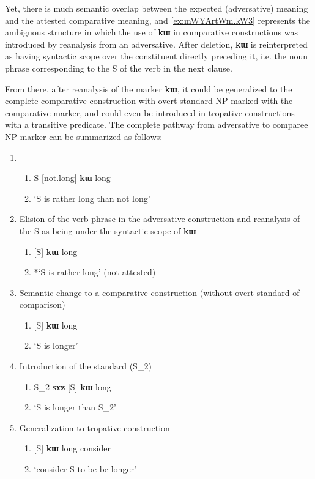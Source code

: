 \documentclass[oldfontcommands,oneside,a4paper,11pt]{article}
\newcommand{\ipa}[1]{{\phon\textbf{#1}}}
\begin{document}
  
  Yet, there is much semantic overlap   between the expected (adversative) meaning and the attested comparative meaning, and \ref{ex:mWYArtWm.kW3}   represents the ambiguous structure in which the use of \ipa{kɯ} in comparative constructions was introduced by reanalysis from an adversative. After deletion, \ipa{kɯ} is reinterpreted as having syntactic scope over the constituent directly preceding it, i.e. the noun phrase corresponding to the S of the verb in the next clause.
  
  From there, after reanalysis of the marker \ipa{kɯ}, it could be generalized to the complete comparative construction with overt standard NP marked with the comparative marker, and could even be introduced in tropative constructions with a transitive predicate. The complete pathway from adversative to comparee NP marker can be summarized as follows:
  
\begin{enumerate} 
\item 
\begin{enumerate} 
\item S [not.long] \ipa{kɯ} long 
\item `S is rather long than not long'
\end{enumerate} 
\item Elision of the verb phrase in the adversative construction  and reanalysis of the S as being under the syntactic scope of \ipa{kɯ}
\begin{enumerate} 
\item{} [S] \ipa{kɯ} long  
\item *`S is rather long' (not attested)
\end{enumerate} 
\item Semantic change to a comparative construction (without overt standard of comparison)
\begin{enumerate} 
\item{} [S] \ipa{kɯ} long  
\item `S is longer'  
\end{enumerate} 
\item Introduction of the standard (S_2)
\begin{enumerate} 
\item{} S_2 \ipa{sɤz} [S] \ipa{kɯ} long  
\item  `S is longer than S_2'
\end{enumerate} 
\item Generalization to tropative construction
\begin{enumerate} 
\item{}  [S] \ipa{kɯ} long  consider  
\item  `consider S to be be longer'
\end{enumerate} 
 
\end{enumerate}
  
\end{document}

